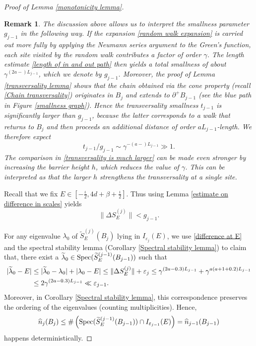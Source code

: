 \documentclass[11pt,reqno,UTF8,twoside]{amsart}
\newcommand{\spec}{{\rm Spec}}
\newcommand{\whn}{\widehat{n}}
\newcommand{\wtSj}{\widetilde{S}^{(j)}}
\newcommand{\wtSjminusone}{\widetilde{S}^{(j-1)}}
\newcommand{\diffSj}{\Delta {S}^{(j)}}
\newtheorem{rmk}{\bf Remark}[section]
\theoremstyle{definition}
\numberwithin{equation}{section}
\begin{document}
\begin{proof}[Proof of Lemma \ref{monotonicity lemma}]
\begin{rmk}
  The discussion above allows us to interpret the smallness parameter $g_{j-1}$ in the following way. If the expansion \eqref{random walk expansion} is carried out more fully by applying the Neumann series argument  to the Green's function, each site visited by the random walk contributes a factor of order $\gamma$. The length estimate \eqref{length of in and out path} then yields a total smallness of about $\gamma^{(2a-)L_{j-1}}$, which we denote  by $g_{j-1}$.
 Moreover, the proof of Lemma \ref{transversality lemma} shows that the chain obtained via the cone property (recall \eqref{Chain transversality}) originates in $B_j$ and extends to $\partial^+ B_{j-1}$ (see the blue path in Figure  \ref{smallness graph}). Hence the transversality smallness $t_{j-1}$ is significantly larger than $g_{j-1}$, because the latter corresponds to a walk that returns to $B_j$ and then proceeds an additional distance of order $aL_{j-1}$-length. We therefore expect
  \begin{equation}\label{transversality is much larger}
      t_{j-1}/ g_{j-1}\sim \gamma^{-(a-)L_{j-1}}\gg 1.
  \end{equation}
  The comparison in \eqref{transversality is much larger} can be made even stronger by increasing the barrier height $h$, which reduces the value of $\gamma$. This can be interpreted as that the larger $h$ strengthens the transversality at a single site.
\end{rmk}



Recall that we fix $E\in  [-\frac{\iota}{2},4d+\beta+\frac{\iota}{2}]$. Thus using  Lemma \ref{estimate on difference in scales} yields 
\begin{equation}\label{difference at E}
  \| \diffSj_E \|< g_{j-1}. 
\end{equation}


For any eigenvalue $\lambda_0$ of $\wtSj_E(B_j)$ lying in $I_{\varepsilon_j}(E)$, we use \eqref{difference at E} and the spectral stability lemma (Corollary \ref{Spectral stability lemma}) to claim that, there exist a $\widetilde{\lambda}_0 \in \spec(\wtSjminusone_E(B_{j-1}))$ such that 
\begin{align}\label{distance tildelambda0 and E}
 \notag |\widetilde{\lambda}_0-E|& \leq |\widetilde{\lambda}_0-\lambda_0|+|\lambda_0-E|\leq \| \diffSj_E \|+\varepsilon_j \leq \gamma^{(2a-0.3)L_{j-1}} +\gamma^{a(a+1+0.2)L_{j-1}}\\
     & \leq 2 \gamma^{(2a-0.3)L_{j-1}} \ll \varepsilon_{j-1}.
\end{align}
Moreover, in Corollary \ref{Spectral stability lemma},  this correspondence preserves the ordering of the eigenvalues (counting multiplicities). Hence,
  \[\whn_j(B_j) \leq \# \left(\spec(\wtSjminusone_{E}(B_{j-1}))\cap I_{\varepsilon_{j-1} }(E)\right)=\whn_{j-1}(B_{j-1})\]
happens deterministically.



\end{proof}
\end{document}
